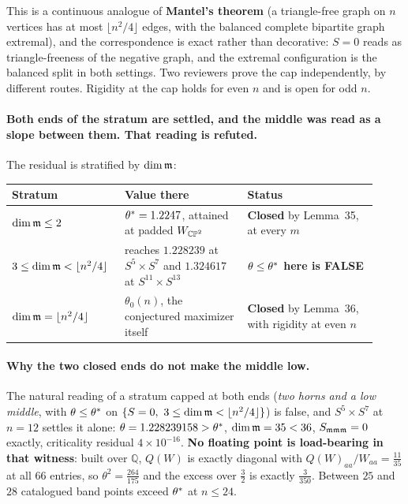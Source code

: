 This is a continuous analogue of \textbf{Mantel's theorem} (a triangle-free graph on $n$ vertices has at most $\lfloor n^2/4\rfloor$ edges, with the balanced complete bipartite graph extremal), and the correspondence is exact rather than decorative: $S=0$ reads as triangle-freeness of the negative graph, and the extremal configuration is the balanced split in both settings. Two reviewers prove the cap independently, by different routes. Rigidity at the cap holds for even $n$ and is open for odd $n$.

\paragraph{Both ends of the stratum are settled, and the middle was read as a slope between them. That reading is refuted.} The residual is stratified by $\dim\mathfrak{m}$:

\begin{center}
\begin{tabular}{@{}p{0.26\linewidth}p{0.32\linewidth}p{0.34\linewidth}@{}}
\toprule
\textbf{Stratum} & \textbf{Value there} & \textbf{Status} \\
\midrule
$\dim\mathfrak{m}\le2$ & $\theta^{*}=1.2247$, attained at padded $W_{\mathbb{CP}^2}$ & \textbf{Closed} by Lemma~35, at every $m$ \\
\addlinespace
$3\le\dim\mathfrak{m}<\lfloor n^2/4\rfloor$ & reaches $1.228239$ at $S^5\times S^7$ and $1.324617$ at $S^{11}\times S^{13}$ & \textbf{$\theta\le\theta^{*}$ here is FALSE} \\
\addlinespace
$\dim\mathfrak{m}=\lfloor n^2/4\rfloor$ & $\theta_0(n)$, the conjectured maximizer itself & \textbf{Closed} by Lemma~36, with rigidity at even $n$ \\
\bottomrule
\end{tabular}
\end{center}

\paragraph{Why the two closed ends do not make the middle low.} The natural reading of a stratum capped at both ends (\emph{two horns and a low middle}, with $\theta\le\theta^{*}$ on $\{S=0,\ 3\le\dim\mathfrak{m}<\lfloor n^2/4\rfloor\}$) is false, and $S^5\times S^7$ at $n=12$ settles it alone: $\theta=1.228239158>\theta^{*}$, $\dim\mathfrak{m}=35<36$, $S_{\mathfrak{m}\mathfrak{m}\mathfrak{m}}=0$ exactly, criticality residual $4\times10^{-16}$. \textbf{No floating point is load-bearing in that witness}: built over $\mathbb Q$, $Q(W)$ is exactly diagonal with $Q(W)_{aa}/W_{aa}=\tfrac{11}{35}$ at all $66$ entries, so $\theta^2=\tfrac{264}{175}$ and the excess over $\tfrac32$ is exactly $\tfrac3{350}$. Between $25$ and $28$ catalogued band points exceed $\theta^{*}$ at $n\le24$.

